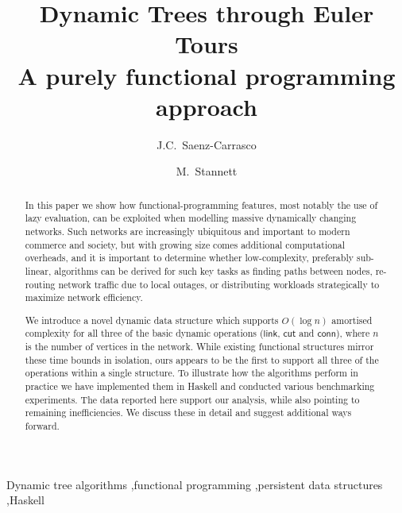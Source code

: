 \documentclass{elsarticle}
\newcommand{\MATHSF}[1]{\ensuremath{\mathsf{#1}}\xspace}
\newcommand{\link}{\MATHSF{link}}
\newcommand{\cut}{\MATHSF{cut}}
\newcommand{\conn}{\MATHSF{conn}}
\begin{document}
\title{Dynamic Trees through Euler Tours\\%
\large{A purely functional programming approach}}

\author{J.C.~Saenz-Carrasco}

\author{M.~Stannett}

\address{Department of Computer Science,\\
Regent Court, 211 Portobello,\\
Sheffield S1 4DP, United Kingdom}


\begin{abstract}
In this paper we show how functional-programming features, most notably the use of lazy evaluation, can be exploited when modelling massive dynamically changing networks. Such networks are increasingly ubiquitous and important to modern commerce and society, but with growing size comes additional computational overheads, and it is important to determine whether low-complexity, preferably sub-linear, algorithms can be derived for such key tasks as finding paths between nodes, re-routing network traffic due to local outages, or distributing workloads strategically to maximize network efficiency.

We introduce a novel dynamic data structure which supports $O(\log n)$ amortised complexity for all three of the basic dynamic operations (\link, \cut and \conn), where $n$ is the number of vertices in the network. While existing functional structures mirror these time bounds in isolation, ours appears to be the first to support all three of the operations within a single structure. To illustrate how the algorithms perform in practice we have implemented them in Haskell and conducted various benchmarking experiments. The data reported here support our analysis, while also pointing to remaining inefficiencies. We discuss these in detail and suggest additional ways forward.
\end{abstract}

\begin{keyword}
Dynamic tree algorithms \sep functional programming \sep persistent data structures \sep Haskell
\end{keyword}


\maketitle






%
 
 
 
 

\end{document}
